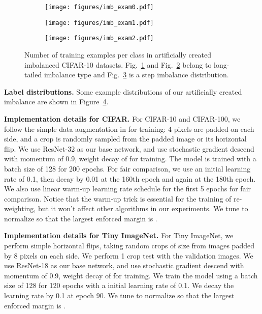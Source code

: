 \documentclass{article}
\begin{document}
\begin{figure}
     \centering
     \begin{subfigure}[b]{0.32\textwidth}
         \centering
         \texttt{[image: figures/imb\_exam0.pdf]}
         \caption{}
         \label{fig:exp_10}
     \end{subfigure}
     \hfill
     \begin{subfigure}[b]{0.32\textwidth}
         \centering
         \texttt{[image: figures/imb\_exam1.pdf]}
         \caption{}
         \label{fig:exp_100}
     \end{subfigure}
     \hfill
     \begin{subfigure}[b]{0.32\textwidth}
         \centering
         \texttt{[image: figures/imb\_exam2.pdf]}
         \caption{}
         \label{fig:hard_10}
     \end{subfigure}
        \caption{Number of training examples per class in artificially created imbalanced CIFAR-10 datasets. Fig.~\ref{fig:exp_10} and Fig.~\ref{fig:exp_100} belong to long-tailed imbalance type and Fig.~\ref{fig:hard_10} is a step imbalance distribution.}
        \label{fig:imb_example}
\end{figure}

\textbf{Label distributions.} Some example distributions of our artificially created imbalance are shown in Figure~\ref{fig:imb_example}.

\textbf{Implementation details for CIFAR.} For CIFAR-10 and CIFAR-100, we follow the simple data augmentation in \citep{he2016deep} for training: 4 pixels are padded on each side, and a  crop is randomly sampled from the padded image or its horizontal flip. We use ResNet-32 \citep{he2016deep} as our base network, and use stochastic gradient descend with momentum of 0.9, weight decay of  for training. The model is trained with a batch size of 128 for 200 epochs. For fair comparison, we use an initial learning rate of 0.1, then decay by 0.01 at the 160th epoch and again at the 180th epoch. We also use linear warm-up learning rate schedule \citep{goyal2017accurate} for the first 5 epochs for fair comparison. Notice that the warm-up trick is essential for the training of re-weighting, but it won't affect other algorithms in our experiments. We tune  to normalize  so that the largest enforced margin is .

\textbf{Implementation details for Tiny ImageNet.} For Tiny ImageNet, we perform simple horizontal flips, taking random crops of size  from images padded by 8 pixels on each side. We perform 1 crop test with the validation images. We use ResNet-18 \citep{he2016deep} as our base network, and use stochastic gradient descend with momentum of 0.9, weight decay of  for training. We train the model using a batch size of 128 for 120 epochs with a initial learning rate of 0.1. We decay the learning rate by 0.1 at epoch 90. We tune  to normalize  so that the largest enforced margin is .
\end{document}
